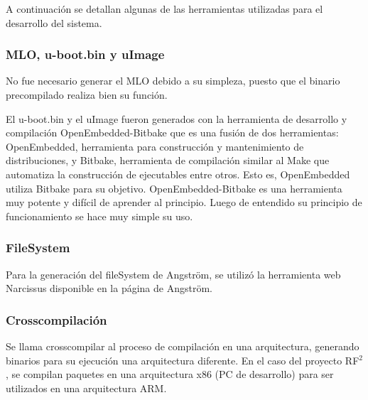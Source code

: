 \documentclass[%
        final,
        notitlepage,
        narroweqnarray,
        inline,
        ]{ieee}
\begin{document}
A continuación se detallan algunas de las herramientas utilizadas para el desarrollo del sistema. 

\subsubsection{MLO, u-boot.bin y uImage}
No fue necesario generar el MLO debido a su simpleza, puesto que el binario precompilado realiza bien su función.

El u-boot.bin y el uImage fueron generados con la herramienta de desarrollo y compilación OpenEmbedded-Bitbake que es una fusión de dos herramientas: OpenEmbedded, herramienta para construcción y mantenimiento de distribuciones, y Bitbake, herramienta de compilación similar al Make que automatiza la construcción de ejecutables entre otros. Esto es, OpenEmbedded utiliza Bitbake para su objetivo. OpenEmbedded-Bitbake es una herramienta muy potente y difícil de aprender al principio. Luego de entendido su principio de funcionamiento se hace muy simple su uso.

\subsubsection{FileSystem}
Para la generación del fileSystem de Angström, se utilizó la herramienta web Narcissus disponible en la página de Angström.

\subsubsection{Crosscompilación}
Se llama crosscompilar al proceso de compilación en una arquitectura, generando binarios para su ejecución una arquitectura diferente. En el caso del proyecto RF$^{2}$, se compilan paquetes en una arquitectura x86 (PC de desarrollo) para ser utilizados en una arquitectura ARM.
\end{document}

